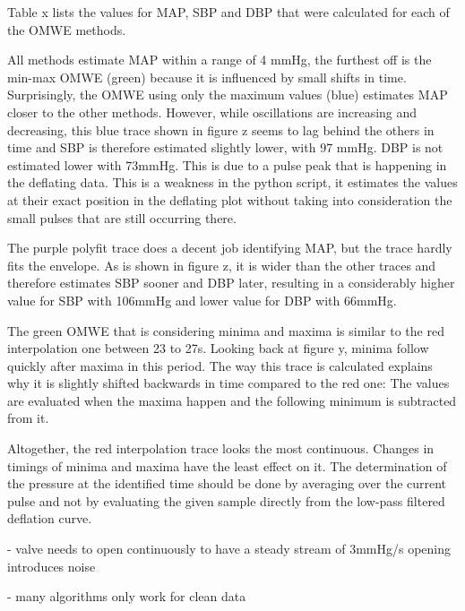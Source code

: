 Table x lists the values for MAP, SBP and DBP that were calculated for each of the OMWE methods. 

All methods estimate MAP within a range of 4 mmHg, the furthest off is the min-max OMWE (green) because it is influenced by small shifts in time. Surprisingly, the OMWE using only the maximum values (blue) estimates MAP closer to the other methods. However, while oscillations are increasing and decreasing, this blue trace shown in figure z seems to lag behind the others in time and SBP is therefore estimated slightly lower, with 97 mmHg. DBP is not estimated lower with 73mmHg. This is due to a pulse peak that is happening in the deflating data. This is a weakness in the python script, it estimates the values at their exact position in the deflating plot without taking into consideration the small pulses that are still occurring there.

The purple polyfit trace does a decent job identifying MAP, but the trace hardly fits the envelope. As is shown in figure z, it is wider than the other traces and therefore estimates SBP sooner and DBP later, resulting in a considerably higher value for SBP with 106mmHg and lower value for DBP with 66mmHg. 

The green OMWE that is considering minima and maxima is similar to the red interpolation one between 23 to 27s. Looking back at figure y, minima follow quickly after maxima in this period. The way this trace is calculated explains why it is slightly shifted backwards in time compared to the red one: The values are evaluated when the maxima happen and the following minimum is subtracted from it. 

Altogether, the red interpolation trace looks the most continuous. Changes in timings of minima and maxima have the least effect on it. The determination of the pressure at the identified time should be done by averaging over the current pulse and not by evaluating the given sample directly from the low-pass filtered deflation curve.
%





- valve needs to open continuously to have a steady stream of 3mmHg/s
  opening introduces noise

- many algorithms only work for clean data

